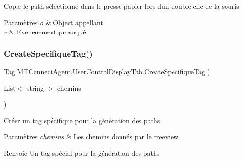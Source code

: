 Copie le path sélectionné dans le presse-\/papier lors d\textquotesingle{}un double clic de la souris 


\begin{DoxyParams}{Paramètres}
{\em o} & Object appellant\\
\hline
{\em e} & Evenenement provoqué\\
\hline
\end{DoxyParams}
\mbox{\label{class_m_t_connect_agent_1_1_user_control_display_tab_a97ab71f68df06c33f0420131314c8a68}} 
\subsubsection{\texorpdfstring{Create\+Specifique\+Tag()}{CreateSpecifiqueTag()}}
{\footnotesize\ttfamily \mbox{\hyperlink{class_m_t_connect_agent_1_1_model_1_1_tag}{Tag}} M\+T\+Connect\+Agent.\+User\+Control\+Display\+Tab.\+Create\+Specifique\+Tag (\begin{DoxyParamCaption}\item[{List$<$ string $>$}]{chemins }\end{DoxyParamCaption})\hspace{0.3cm}{\ttfamily [inline]}}



Créer un tag spécifique pour la génération des paths 


\begin{DoxyParams}{Paramètres}
{\em chemins} & Les chemins donnés par le treeview\\
\hline
\end{DoxyParams}
\begin{DoxyReturn}{Renvoie}
Un tag spécial pour la génération des paths
\end{DoxyReturn}
\mbox{\label{class_m_t_connect_agent_1_1_user_control_display_tab_a7fc3123014a0546fd4fb29d2ced80183}} 
